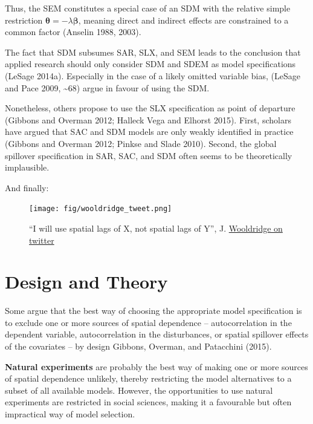 \documentclass[
  letterpaper,
  DIV=11,
  numbers=noendperiod]{scrreprt}
\begin{document}
Thus, the SEM constitutes a special case of an SDM with the relative
simple restriction
\({\boldsymbol{\mathbf{\theta}}}=-\lambda{\boldsymbol{\mathbf{\beta}}}\),
meaning direct and indirect effects are constrained to a common factor
(Anselin 1988, 2003).

The fact that SDM subsumes SAR, SLX, and SEM leads to the conclusion
that applied research should only consider SDM and SDEM as model
specifications (LeSage 2014a). Especially in the case of a likely
omitted variable bias, (LeSage and Pace 2009, \textasciitilde68) argue
in favour of using the SDM.

Nonetheless, others propose to use the SLX specification as point of
departure (Gibbons and Overman 2012; Halleck Vega and Elhorst 2015).
First, scholars have argued that SAC and SDM models are only weakly
identified in practice (Gibbons and Overman 2012; Pinkse and Slade
2010). Second, the global spillover specification in SAR, SAC, and SDM
often seems to be theoretically implausible.

And finally:

\begin{figure}

{\centering \texttt{[image: fig/wooldridge\_tweet.png]}

}

\caption{``I will use spatial lags of X, not spatial lags of Y'', J.
\href{https://twitter.com/jmwooldridge/status/1369460526770753537}{Wooldridge
on twitter}}

\end{figure}

\hypertarget{design-and-theory}{%
\section{Design and Theory}\label{design-and-theory}}

Some argue that the best way of choosing the appropriate model
specification is to exclude one or more sources of spatial dependence --
autocorrelation in the dependent variable, autocorrelation in the
disturbances, or spatial spillover effects of the covariates -- by
design Gibbons, Overman, and Patacchini (2015).

\textbf{Natural experiments} are probably the best way of making one or
more sources of spatial dependence unlikely, thereby restricting the
model alternatives to a subset of all available models. However, the
opportunities to use natural experiments are restricted in social
sciences, making it a favourable but often impractical way of model
selection.
\end{document}
